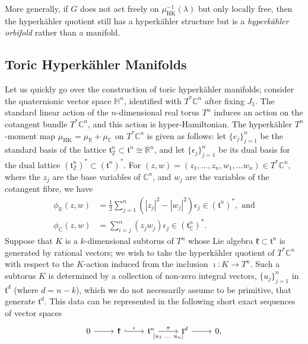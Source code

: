 \documentclass{amsart}
\newcommand{\ra}{\rightarrow}
\newcommand{\e}{\epsilon}
\newcommand{\RR}{\mathbb{R}}
\newcommand{\CC}{\mathbb{C}}
\newcommand{\ZZ}{\mathbb{Z}}
\newcommand{\HH}{\mathbb{H}}
\newcommand{\mfk}{\mathfrak{k}}
\newcommand{\mft}{\mathfrak{t}}
\DeclareMathOperator{\HK}{HK}
\begin{document}
	More generally, if $G$ does not act freely on $\mu_{\HK}^{-1}(\lambda)$ but only locally free, then the hyperk\"ahler quotient still has a hyperk\"ahler structure but is a \emph{hyperk\"ahler orbifold} rather than a manifold.
	
	
	
	\subsection{Toric Hyperk\"ahler Manifolds}
	
	Let us quickly go over the construction of toric hyperk\"ahler manifolds; consider the quaternionic vector space $\HH^{n}$, identified with $T^{\ast}\CC^{n}$ after fixing $J_{1}$. The standard linear action of the $n$-dimensional real torus $T^{n}$ induces an action on the cotangent bundle $T^{\ast}\CC^{n}$, and this action is hyper-Hamiltonian. The hyperk\"ahler $T^{n}$-moment map $\mu_{\HK} = \mu_{\RR} + \mu_{\CC}$ on $T^{\ast}\CC^{n}$ is given as follows: let $\{e_{j}\}_{j=1}^{n}$ be the standard basis of the lattice $\mft_{\ZZ}^{n} \subset \mft^{n} \cong \RR^{n}$, and let $\{\e_{j}\}_{j=1}^{n}$ be its dual basis for the dual lattice $(\mft_{\ZZ}^{n})^{\ast} \subset (\mft^{n})^{\ast}$. For $(z,w) = (z_{1},\ldots, z_{n}, w_{1},\ldots w_{n}) \in T^{\ast}\CC^{n}$, where the $z_{j}$ are the base variables of $\CC^{n}$, and $w_{j}$ are the variables of the cotangent fibre, we have
	\begin{align*}%
		\phi_{\RR}(z,w) &= \frac{1}{2} \sum_{j=1}^{n} \left( |z_{j}|^2 - |w_{j}|^2 \right) \e_{j} \in (\mft^{n})^{\ast},
		\mbox{ and}\\
		\phi_{\CC}(z,w) &= \sum_{i=j}^{n} (z_{j} w_{j}) \e_{j} \in (\mft_{\CC}^{n})^{\ast}.
	\end{align*}
	Suppose that $K$ is a $k$-dimensional subtorus of $T^{n}$ whose Lie algebra $\mfk \subset \mft^{n}$ is generated by rational vectors; we wish to take the hyperk\"ahler quotient of $T^{\ast}\CC^{n}$ with respect to the $K$-action induced from the inclusion $\imath : K \ra T^{n}$. Such a subtorus $K$ is determined by a collection of non-zero integral vectors, $\{u_{j}\}_{j=1}^{n}$ in $\mft^{d}$ (where $d = n - k$), which we do not necessarily assume to be primitive, that generate $\mft^{d}$. This data can be represented in the following short exact sequences of vector spaces
	\[
		\begin{tikzcd}[ampersand replacement=\&]
			0 \ar[r] \&
			\mfk \ar[r, hook, "\imath"] \& \mft^{n} \arrow{r}{\pi}[swap]{[u_{1}\ \ldots \ u_{n}]} \& \mft^{d} \ar[r] \& 0,
		\end{tikzcd}
	\]
\end{document}
